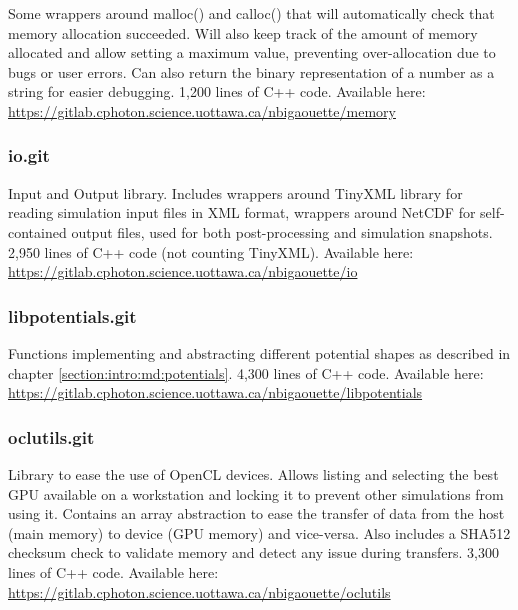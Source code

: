 Some wrappers around malloc() and calloc() that will automatically check that
memory allocation succeeded. Will also keep track of the amount of
memory allocated and allow setting a maximum value, preventing
over-allocation due to bugs or user errors. Can also return the binary
representation of a number as a string for easier debugging. 1,200 lines of
C++ code. Available here:\\
\url{https://gitlab.cphoton.science.uottawa.ca/nbigaouette/memory}


\subsubsection{io.git} \label{section:tools:libraries:io}

Input and Output library. Includes wrappers around TinyXML library\cite{tinyxml}
for reading simulation input files in XML format,
wrappers around NetCDF\cite{netcdf} for self-contained
output files, used for both post-processing and simulation snapshots.
2,950 lines of C++ code (not counting TinyXML). Available here:\\
\url{https://gitlab.cphoton.science.uottawa.ca/nbigaouette/io}


\subsubsection{libpotentials.git} \label{section:tools:libraries:libpotentials}

Functions implementing and abstracting different potential shapes as
described in chapter \ref{section:intro:md:potentials}. 4,300 lines of C++ code.
Available here:\\
\url{https://gitlab.cphoton.science.uottawa.ca/nbigaouette/libpotentials}


\subsubsection{oclutils.git} \label{section:tools:libraries:oclutils}

Library to ease the use of OpenCL devices. Allows listing and selecting the
best GPU available on a workstation and locking it to prevent
other simulations from using it. Contains an array abstraction to ease the
transfer of data from the host (main memory) to device (GPU memory) and
vice-versa. Also includes a SHA512 checksum check to validate memory
and detect any issue during transfers. 3,300 lines of C++ code.
Available here:
\url{https://gitlab.cphoton.science.uottawa.ca/nbigaouette/oclutils}


